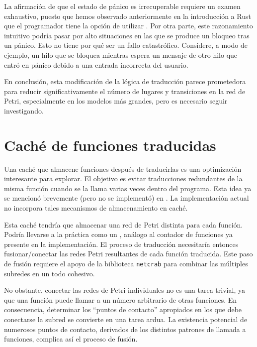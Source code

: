 La afirmación de que el estado de pánico es irrecuperable requiere un examen exhaustivo, puesto
que hemos observado anteriormente en la introducción a Rust que el programador tiene la
opción de utilizar . Por otra parte, este razonamiento intuitivo podría pasar
por alto situaciones en las que se produce un bloqueo tras un pánico. Esto no tiene por qué ser
un fallo catastrófico. Considere, a modo de ejemplo, un hilo que se bloquea mientras espera un
mensaje de otro hilo que entró en pánico debido a una entrada incorrecta del usuario.

En conclusión, esta modificación de la lógica de traducción parece prometedora para reducir
significativamente el número de lugares y transiciones en la red de Petri, especialmente en los modelos
más grandes, pero es necesario seguir investigando.

\section{Caché de funciones traducidas}
\label{sec:future-work-function-cache}

Una caché que almacene funciones después de traducirlas
es una optimización interesante para explorar.
El objetivo es evitar traducciones redundantes de la misma función cuando se la llama
varias veces dentro del programa. Esta idea ya se mencionó brevemente (pero no se
implementó) en \cite{meyer2020}.
La implementación actual no incorpora tales mecanismos de almacenamiento en caché.

Esta caché tendría que almacenar una red de Petri distinta para cada función.
Podría llevarse a la práctica como un
,
análogo al contador de funciones ya presente en la implementación.
El proceso de traducción necesitaría entonces fusionar/conectar las redes Petri
resultantes de cada función traducida.
Este paso de fusión requiere el apoyo de la biblioteca
\texttt{netcrab} para combinar las múltiples subredes en un todo cohesivo.

No obstante, conectar las redes de Petri individuales no es una tarea trivial,
ya que una función puede llamar a un número arbitrario de otras funciones.
En consecuencia, determinar los ``puntos de contacto'' apropiados
en los que debe conectarse la subred se convierte en una tarea ardua.
La existencia potencial de numerosos puntos de contacto, derivados de los distintos
patrones de llamada a funciones, complica así el proceso de fusión.

